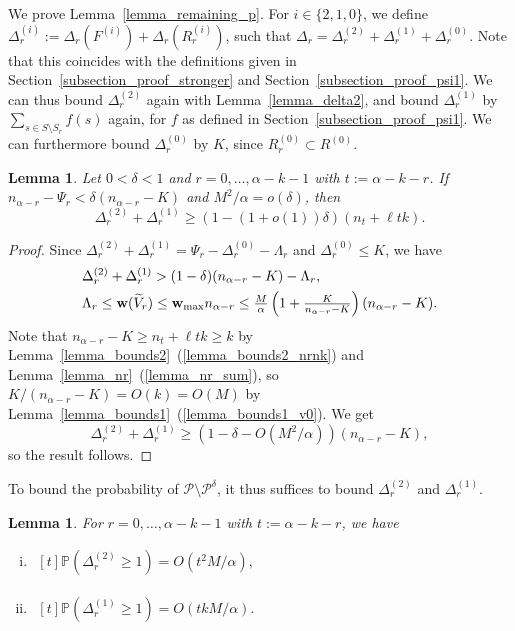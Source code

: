 \documentclass{article}
\theoremstyle{plain}
\theoremstyle{remark}
\theoremstyle{plain}
\newtheorem{lemma}[theorem]{Lemma}
\numberwithin{equation}{section}
\renewcommand{\b}{{\bf{w}}}
\begin{document}
	We prove Lemma~\ref{lemma_remaining_p}. For $i\in\{2,1,0\}$, we define $\Delta_r^{(i)}:=\Delta_r(F^{(i)})+\Delta_r(R_r^{(i)})$, such that $\Delta_r=\Delta_r^{(2)}+\Delta_r^{(1)}+\Delta_r^{(0)}$. Note that this coincides with the definitions given in Section~\ref{subsection_proof_stronger} and Section~\ref{subsection_proof_psi1}. We can thus bound $\Delta_r^{(2)}$ again with Lemma~\ref{lemma_delta2}, and bound $\Delta_r^{(1)}$ by $\sum_{s\in S\setminus S_r}f(s)$ again, for $f$ as defined in Section~\ref{subsection_proof_psi1}. We can furthermore bound $\Delta_r^{(0)}$ by $K$, since $R_r^{(0)}\subset R^{(0)}$.
	
	\begin{lemma}\label{lemma_boundpt}
		Let $0<\delta<1$ and $r=0,\ldots,\alpha-k-1$ with $t:=\alpha-k-r$. If $n_{\alpha-r}-\Psi_r<\delta(n_{\alpha-r}-K)$ and $M^2/\alpha=o(\delta)$, then $$\Delta_r^{(2)}+\Delta_r^{(1)}\geq(1-(1+o(1))\delta)(n_t+\ell tk).$$
	\end{lemma}
	
	\begin{proof}
		Since $\Delta_r^{(2)}+\Delta_r^{(1)}=\Psi_r-\Delta_r^{(0)}-\Lambda_r$ and $\Delta_r^{(0)}\leq K$, we have
		\begin{align}
			&\Delta_r^{(2)}+\Delta_r^{(1)}>(1-\delta)(n_{\alpha-r}-K)-\Lambda_r,
			\\&\Lambda_r\leq\b(\widetilde{V}_r)\leq\b_{\max}n_{\alpha-r}\leq\tfrac{M}{\alpha}\left(1+\tfrac{K}{n_{\alpha-r}-K}\right)(n_{\alpha-r}-K).
		\end{align}
		Note that $n_{\alpha-r}-K\geq n_t+\ell tk\geq k$ by Lemma~\ref{lemma_bounds2}~(\ref{lemma_bounds2_nrnk}) and Lemma~\ref{lemma_nr}~(\ref{lemma_nr_sum}), so $K/(n_{\alpha-r}-K)=O(k)=O(M)$ by Lemma~\ref{lemma_bounds1}~(\ref{lemma_bounds1_v0}). We get $$\Delta_r^{(2)}+\Delta_r^{(1)}\geq(1-\delta-O(M^2/\alpha))(n_{\alpha-r}-K),$$ so the result follows.
	\end{proof}
	
	To bound the probability of $\mathcal{P}\setminus\mathcal{P}^{\delta}$, it thus suffices to bound $\Delta_r^{(2)}$ and $\Delta_r^{(1)}$.
	
	\begin{lemma}\label{lemma_pd0}
		For $r=0,\ldots,\alpha-k-1$ with $t:=\alpha-k-r$, we have
		\begin{enumerate}[(i)]
			\item\label{lemma_pd0_d2} $\begin{aligned}[t]
				\mathbb{P}(\Delta_r^{(2)}\geq1)=O(t^2M/\alpha),
			\end{aligned}$
			\item\label{lemma_pd0_d1} $\begin{aligned}[t]
				\mathbb{P}(\Delta_r^{(1)}\geq1)=O(tkM/\alpha).
			\end{aligned}$
		\end{enumerate}
	\end{lemma}
	
\end{document}
